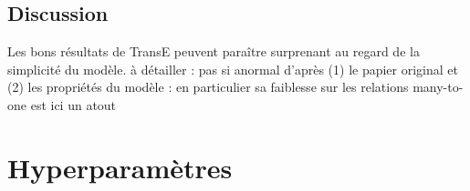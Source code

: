 \subsection{Discussion}
\label{subsec:te-discussion}

Les bons résultats de TransE peuvent paraître surprenant au regard de la simplicité du modèle. à détailler : pas si anormal d'après (1) le papier original et (2) les propriétés du modèle : en particulier sa faiblesse sur les relations many-to-one est ici un atout


\section{Hyperparamètres}
\label{sec:te-hp}

